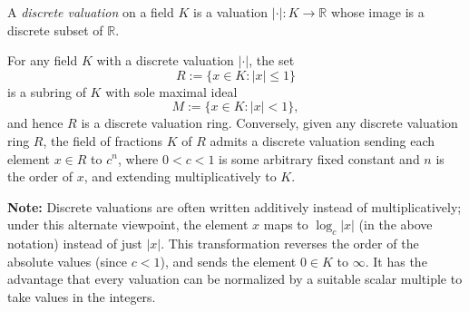 \documentclass[12pt]{article}
\newcommand{\R}{\mathbb{R}}
\begin{document}
A {\em discrete valuation} on a field $K$ is a valuation $|\cdot|: K \to \R$ whose image is a discrete subset of $\R$.

For any field $K$ with a discrete valuation $|\cdot|$, the set
$$
R := \{x \in K : |x| \leq 1\}
$$
is a subring of $K$ with sole maximal ideal
$$
M := \{x \in K : |x| < 1\},
$$
and hence $R$ is a discrete valuation ring. Conversely, given any discrete valuation ring $R$, the field of fractions $K$ of $R$ admits a discrete valuation sending each element $x \in R$ to $c^n$, where $0 < c < 1$ is some arbitrary fixed constant and $n$ is the order of $x$, and extending multiplicatively to $K$.

{\bf Note:} Discrete valuations are often written additively instead of multiplicatively; under this alternate viewpoint, the element $x$ maps to $\log_c|x|$ (in the above notation) instead of just $|x|$. This transformation reverses the order of the absolute values (since $c < 1$), and sends the element $0 \in K$ to $\infty$. It has the advantage that every valuation can be normalized by a suitable scalar multiple to take values in the integers.
\end{document}
